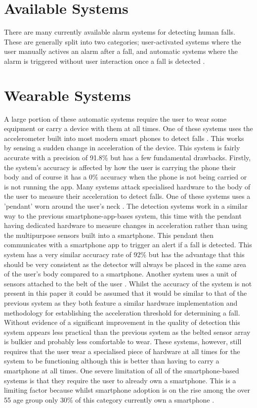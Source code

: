 \documentclass[11pt,a4paper]{report}
\begin{document}
\section{Available Systems}
There are many currently available alarm systems for detecting human falls. These are generally split into two categories; user-activated systems where the user manually actives an alarm after a fall, and automatic systems where the alarm is triggered without user interaction once a fall is detected \citep{Alwan_A_smart_and_passive_floor-vibration}. 

\section{Wearable Systems}
A large portion of these automatic systems require the user to wear some equipment or carry a device with them at all times. One of these systems uses the accelerometer built into most modern smart phones to detect falls \citep{Tsinganos_A_smartphone-based_fall}. This works by sensing a sudden change in acceleration of the device. This system is fairly accurate with a precision of 91.8\% but has a few fundamental drawbacks. Firstly, the system's accuracy is affected by how the user is carrying the phone their body and of course it has a 0\% accuracy when the phone is not being carried or is not running the app. Many systems attack specialised hardware to the body of the user to measure their acceleration to detect falls. One of these systems uses a 'pendant' worn around the user's neck \citep{Santiago_Fall_detection_system}. The detection systems work in a similar way to the previous smartphone-app-bases system, this time with the pendant having dedicated hardware to measure changes in acceleration rather than using the multipurpose sensors built into a smartphone. This pendant then communicates with a smartphone app to trigger an alert if a fall is detected. This system has a very similar accuracy rate of 92\% but has the advantage that this should be very consistent as the detector will always be placed in the same area of the user's body compared to a smartphone. Another system uses a unit of sensors attached to the belt of the user \citep{Cruz_Fall_detection_wearable_device}. Whilst the accuracy of the system is not present in this paper it could be assumed that it would be similar to that of the previous system as they both feature a similar hardware implementation and methodology for establishing the acceleration threshold for determining a fall. Without evidence of a significant improvement in the quality of detection this system appears less practical than the previous system as the belted sensor array is bulkier and probably less comfortable to wear. These systems, however, still requires that the user wear a specialised piece of hardware at all times for the system to be functioning although this is better than having to carry a smartphone at all times. One severe limitation of all of the smartphone-based systems is that they require the user to already own a smartphone. This is a limiting factor because whilst smartphone adoption is on the rise among the over 55 age group only 30\% of this category currently own a smartphone \citep{Berenguer_Are_Smartphones_Ubiquitous}. 
\end{document}
